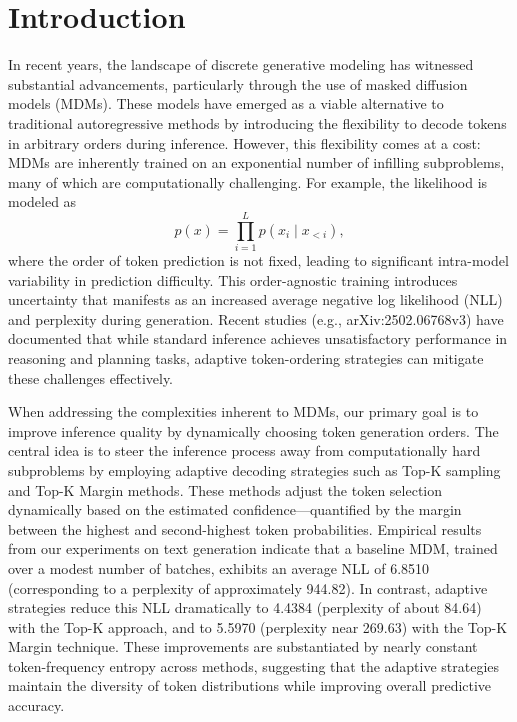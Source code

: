\documentclass{article}
\begin{document}
\section{Introduction}
In recent years, the landscape of discrete generative modeling has witnessed substantial advancements, particularly through the use of masked diffusion models (MDMs). These models have emerged as a viable alternative to traditional autoregressive methods by introducing the flexibility to decode tokens in arbitrary orders during inference. However, this flexibility comes at a cost: MDMs are inherently trained on an exponential number of infilling subproblems, many of which are computationally challenging. For example, the likelihood is modeled as 
\[
p(x) = \prod_{i=1}^{L} p(x_i \mid x_{<i}),
\]
where the order of token prediction is not fixed, leading to significant intra-model variability in prediction difficulty. This order-agnostic training introduces uncertainty that manifests as an increased average negative log likelihood (NLL) and perplexity during generation. Recent studies (e.g., arXiv:2502.06768v3) have documented that while standard inference achieves unsatisfactory performance in reasoning and planning tasks, adaptive token-ordering strategies can mitigate these challenges effectively.

When addressing the complexities inherent to MDMs, our primary goal is to improve inference quality by dynamically choosing token generation orders. The central idea is to steer the inference process away from computationally hard subproblems by employing adaptive decoding strategies such as Top-K sampling and Top-K Margin methods. These methods adjust the token selection dynamically based on the estimated confidence—quantified by the margin between the highest and second-highest token probabilities. Empirical results from our experiments on text generation indicate that a baseline MDM, trained over a modest number of batches, exhibits an average NLL of 6.8510 (corresponding to a perplexity of approximately 944.82). In contrast, adaptive strategies reduce this NLL dramatically to 4.4384 (perplexity of about 84.64) with the Top-K approach, and to 5.5970 (perplexity near 269.63) with the Top-K Margin technique. These improvements are substantiated by nearly constant token-frequency entropy across methods, suggesting that the adaptive strategies maintain the diversity of token distributions while improving overall predictive accuracy.
\end{document}
